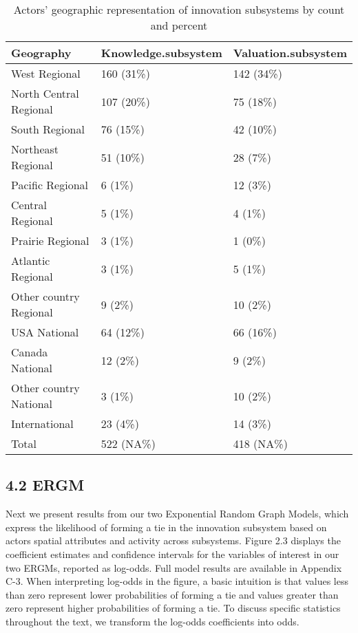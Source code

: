 \documentclass[twoside,12pt,final]{ucthesis-CA2012}
\begin{document}
\begin{ucmainmatter}
\begin{table}
\caption{\label{tab:unnamed-chunk-17}Actors' geographic representation of innovation subsystems by count and percent}
\centering
\begin{tabular}[t]{lll}
\toprule
Geography & Knowledge.subsystem & Valuation.subsystem\\
\midrule
West Regional & 160 (31\%) & 142 (34\%)\\
North Central Regional & 107 (20\%) & 75 (18\%)\\
South Regional & 76 (15\%) & 42 (10\%)\\
Northeast Regional & 51 (10\%) & 28 (7\%)\\
Pacific Regional & 6 (1\%) & 12 (3\%)\\
\addlinespace
Central Regional & 5 (1\%) & 4 (1\%)\\
Prairie Regional & 3 (1\%) & 1 (0\%)\\
Atlantic Regional & 3 (1\%) & 5 (1\%)\\
Other country Regional & 9 (2\%) & 10 (2\%)\\
USA National & 64 (12\%) & 66 (16\%)\\
\addlinespace
Canada National & 12 (2\%) & 9 (2\%)\\
Other country National & 3 (1\%) & 10 (2\%)\\
International & 23 (4\%) & 14 (3\%)\\
Total & 522 (NA\%) & 418 (NA\%)\\
\bottomrule
\end{tabular}
\end{table}
\hypertarget{ergm}{%
\subsection{4.2 ERGM}\label{ergm}}

Next we present results from our two Exponential Random Graph Models,
which express the likelihood of forming a tie in the innovation
subsystem based on actors\textquotesingle{} spatial attributes and activity across
subsystems. Figure 2.3 displays the coefficient estimates and confidence
intervals for the variables of interest in our two ERGMs, reported as
log-odds. Full model results are available in Appendix C-3. When
interpreting log-odds in the figure, a basic intuition is that values
less than zero represent lower probabilities of forming a tie and values
greater than zero represent higher probabilities of forming a tie. To
discuss specific statistics throughout the text, we transform the
log-odds coefficients into odds.


\end{ucmainmatter}
\end{document}
